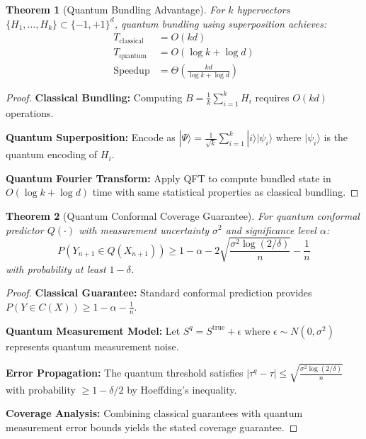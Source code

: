 \documentclass[10pt,twocolumn,letterpaper]{article}
\newtheorem{theorem}{Theorem}
\begin{document}
\begin{theorem}[Quantum Bundling Advantage]
\label{thm:bundling_advantage}
For $k$ hypervectors $\{H_1, \ldots, H_k\} \subset \{-1, +1\}^d$, quantum bundling using superposition achieves:
\begin{align}
T_{\text{classical}} &= O(kd) \\
T_{\text{quantum}} &= O(\log k + \log d) \\
\text{Speedup} &= \Theta\left(\frac{kd}{\log k + \log d}\right)
\end{align}
\end{theorem}

\begin{proof}
\textbf{Classical Bundling:} Computing $B = \frac{1}{k}\sum_{i=1}^k H_i$ requires $O(kd)$ operations.

\textbf{Quantum Superposition:} Encode as $|\Psi\rangle = \frac{1}{\sqrt{k}} \sum_{i=1}^k |i\rangle |\psi_i\rangle$ where $|\psi_i\rangle$ is the quantum encoding of $H_i$.

\textbf{Quantum Fourier Transform:} Apply QFT to compute bundled state in $O(\log k + \log d)$ time with same statistical properties as classical bundling.
\end{proof}

\begin{theorem}[Quantum Conformal Coverage Guarantee]
\label{thm:conformal_coverage}
For quantum conformal predictor $Q(\cdot)$ with measurement uncertainty $\sigma^2$ and significance level $\alpha$:
$$P(Y_{n+1} \in Q(X_{n+1})) \geq 1 - \alpha - 2\sqrt{\frac{\sigma^2\log(2/\delta)}{n}} - \frac{1}{n}$$
with probability at least $1-\delta$.
\end{theorem}

\begin{proof}
\textbf{Classical Guarantee:} Standard conformal prediction provides $P(Y \in C(X)) \geq 1 - \alpha - \frac{1}{n}$.

\textbf{Quantum Measurement Model:} Let $S^q = S^{\text{true}} + \epsilon$ where $\epsilon \sim N(0, \sigma^2)$ represents quantum measurement noise.

\textbf{Error Propagation:} The quantum threshold satisfies $|\tau^q - \tau| \leq \sqrt{\frac{\sigma^2\log(2/\delta)}{n}}$ with probability $\geq 1-\delta/2$ by Hoeffding's inequality.

\textbf{Coverage Analysis:} Combining classical guarantees with quantum measurement error bounds yields the stated coverage guarantee.
\end{proof}
\end{document}
